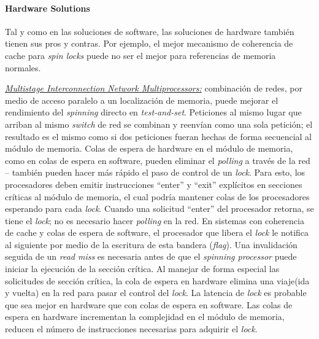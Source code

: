 \paragraph{\textnormal{\textbf{Hardware Solutions}}}
Tal y como en las soluciones de software, las soluciones de hardware también tienen sus pros y contras. Por ejemplo, el mejor mecanismo de coherencia de cache para \textit{spin locks} puede no ser el mejor para referencias de memoria normales. 

\underline{\textit{Multistage Interconnection Network Multiprocessors:}} combinación de redes, por medio de acceso paralelo a un localización de memoria, puede mejorar el rendimiento del \textit{spinning} directo en \textit{test-and-set}. Peticiones al mismo lugar que arriban al mismo \textit{switch} de red se combinan y reenvían como una sola petición; el resultado es el mismo como si dos peticiones fueran hechas de forma secuencial al módulo de memoria. Colas de espera de hardware en el módulo de memoria, como en colas de espera en software, pueden eliminar el \textit{polling} a través de la red -- también pueden hacer más rápido el paso de control de un \textit{lock}. Para esto, los procesadores deben emitir instrucciones ``enter'' y ``exit'' explícitos en secciones críticas al módulo de memoria, el cual podría mantener colas de los procesadores esperando para cada \textit{lock}. Cuando una solicitud ``enter'' del procesador retorna, se tiene el \textit{lock}; no es necesario hacer \textit{polling} en la red. En sistemas con coherencia de cache y colas de espera de software, el procesador que libera el \textit{lock} le notifica al siguiente por medio de la escritura de esta bandera (\textit{flag}). Una invalidación seguida de un \textit{read miss} es necesaria antes de que el \textit{spinning processor} puede iniciar la ejecución de la sección crítica. Al manejar de forma especial las solicitudes de sección crítica, la cola de espera en hardware elimina una viaje(ida y vuelta) en la red para pasar el control del \textit{lock}. La latencia de \textit{lock} es probable que sea mejor en hardware que con colas de espera en software. Las colas de espera en hardware incrementan la complejidad en el módulo de memoria, reducen el número de instrucciones necesarias para adquirir el \textit{lock}. 

